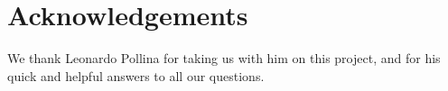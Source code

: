 \documentclass[10pt,conference,compsocconf]{IEEEtran}
\begin{document}


\section*{Acknowledgements}
We thank Leonardo Pollina for taking us with him on this project, and for his quick and helpful answers to all our questions.



\end{document}
